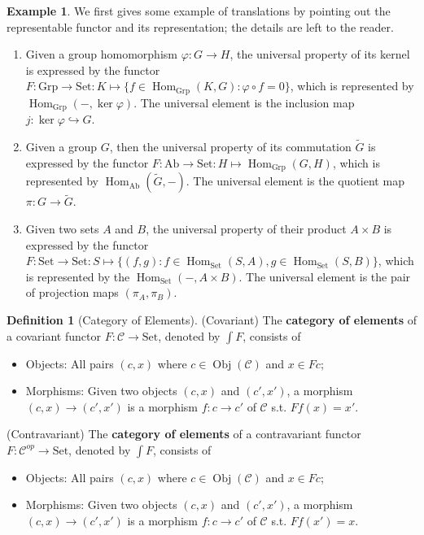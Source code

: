 \documentclass{article}
\theoremstyle{definition}
\newtheorem{definition}{Definition}[section]
\theoremstyle{definition}
\newtheorem{example}{Example}[section]
\theoremstyle{remark}
\DeclareMathOperator{\Obj}{Obj}
\DeclareMathOperator{\Hom}{Hom}
\begin{document}
\begin{example} We first gives some example of translations by pointing out the representable functor and its representation; the details are left to the reader.
	\begin{enumerate}[label=(\roman*)]
		\item Given a group homomorphism $\varphi:G\to H$, the universal property of its kernel is expressed by the functor $F:\mathrm{Grp}\to \mathrm{Set}:K\mapsto \{f\in\Hom_\mathrm{Grp}(K,G):\varphi\circ f=0\}$, which is represented by $\Hom_\mathrm{Grp}(-,\ker\varphi)$. The universal element is the inclusion map $j:\ker \varphi\hookrightarrow G$. 
		\item Given a group $G$, then the universal property of its commutation $\tilde G$ is expressed by the functor $F:\mathrm{Ab}\to \mathrm{Set}:H\mapsto \Hom_\mathrm{Grp}(G,H)$, which is represented by $\Hom_\mathrm{Ab}(\tilde G,-)$. The universal element is the quotient map $\pi:G\to \tilde G$.
		\item Given two sets $A$ and $B$, the universal property of their product $A\times B$ is expressed by the functor $F:\mathrm{Set}\to \mathrm{Set}:S\mapsto \{(f,g):f\in\Hom_\mathrm{Set}(S,A),g\in\Hom_\mathrm{Set}(S,B)\}$, which is represented by the $\Hom_\mathrm{Set}(-,A\times B)$. The universal element is the pair of projection maps $(\pi_A,\pi_B)$.
	\end{enumerate}
\end{example}
\begin{definition}[Category of Elements]
(Covariant) The \textbf{category of elements} of a covariant functor $F:\mathcal{C}\to \mathrm{Set}$, denoted by $\int F$, consists of 
	\begin{itemize}
		\item Objects: All pairs $(c,x)$ where $c\in\Obj(\mathcal{C})$ and $x\in Fc$;
		\item Morphisms: Given two objects $(c,x)$ and $(c',x')$, a morphism $(c,x)\to (c',x')$ is a morphism $f:c\to c'$ of $\mathcal{C}$ s.t. $Ff(x)=x'$.	
	\end{itemize}
(Contravariant) The \textbf{category of elements} of a contravariant functor $F:\mathcal{C}^{op}\to\mathrm{Set}$, denoted by $\int F$, consists of
	\begin{itemize}
		\item Objects: All pairs $(c,x)$ where $c\in \Obj(\mathcal{C})$ and $x\in Fc$;
		\item Morphisms: Given two objects $(c,x)$ and $(c',x')$, a morphism $(c,x)\to (c',x')$ is a morphism $f:c\to c'$ of $\mathcal{C}$ s.t. $Ff(x')=x$.
	\end{itemize}
\end{definition}
\end{document}
